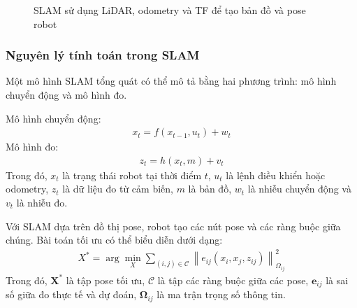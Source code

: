 \begin{figure}[H]
\centering
{}
\caption{SLAM sử dụng LiDAR, odometry và TF để tạo bản đồ và pose robot}
\label{fig:slam-flow}
\end{figure}

\subsubsection{Nguyên lý tính toán trong SLAM}

Một mô hình SLAM tổng quát có thể mô tả bằng hai phương trình: mô hình
chuyển động và mô hình đo.

Mô hình chuyển động:
\begin{gather*}x_{t} = f\left( x_{t - 1},u_{t} \right) + w_{t}\end{gather*}
Mô hình đo:
\begin{gather*}z_{t} = h\left( x_{t},m \right) + v_{t}\end{gather*}
Trong đó, \(x_{t}\) là trạng thái robot tại thời điểm \(t\), \(u_{t}\)
là lệnh điều khiển hoặc odometry, \(z_{t}\) là dữ liệu đo từ cảm biến,
\(m\) là bản đồ, \(w_{t}\) là nhiễu chuyển động và \(v_{t}\) là nhiễu
đo.

Với SLAM dựa trên đồ thị pose, robot tạo các nút pose và các ràng buộc
giữa chúng. Bài toán tối ưu có thể biểu diễn dưới dạng:
\begin{gather*}X^{*} = \arg\min_{X}\sum_{(i,j)\in\mathcal{C}}\left\| e_{ij}\left(x_i,x_j,z_{ij}\right) \right\|_{\Omega_{ij}}^{2}\end{gather*}
Trong đó, \(\mathbf{X}^{*}\) là tập pose tối ưu, \(\mathcal{C}\) là tập
các ràng buộc giữa các pose, \(\mathbf{e}_{ij}\) là sai số giữa đo thực
tế và dự đoán, \(\mathbf{\Omega}_{ij}\) là ma trận trọng số thông tin.

